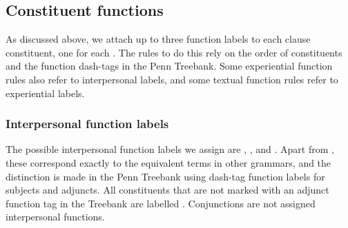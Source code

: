 \documentclass[11pt]{article}
\begin{document}



\subsection{Constituent functions}

As discussed above, we attach up to three function labels to each clause constituent, one for each . The rules to do this rely on the order of constituents and the function dash-tags in the Penn Treebank. Some experiential function rules also refer to interpersonal labels, and some textual function rules refer to experiential labels.

\subsubsection{Interpersonal function labels}
The possible interpersonal function labels we assign are , ,  and . Apart from , these correspond exactly to the equivalent terms in other grammars, and the distinction is made in the Penn Treebank using dash-tag function labels for subjects and adjuncts. All  constituents that are not marked with an adjunct function tag in the Treebank are labelled . Conjunctions are not assigned interpersonal functions.
\end{document}
